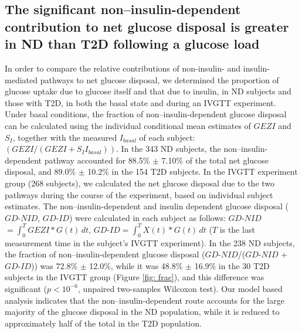 \documentclass[utf8]{frontiersSCNS} %
\begin{document}
\subsection{The significant non–insulin-dependent contribution to net glucose disposal is greater in ND than T2D following a glucose load}
In order to compare the relative contributions of non-insulin- and insulin-mediated pathways to net glucose disposal, we determined the proportion of glucose uptake due to glucose itself and that due to insulin, in ND subjects and those with T2D, in both the basal state and during an IVGTT experiment. Under basal conditions, the fraction of non–insulin-dependent glucose disposal can be calculated using the individual conditional mean estimates of $GEZI$ and $S_I$, together with the measured $I_{basal}$ of each subject: $\left( {GEZI/\left( {GEZI + {S_I}{I_{basal}}} \right)} \right)$. In the 343 ND subjects, the non–insulin-dependent pathway accounted for 88.5\% $\pm$ 7.10\% of the total net glucose disposal, and 89.0\% $\pm$ 10.2\% in the 154 T2D subjects. In the IVGTT experiment group (268 subjects), we calculated the net glucose disposal due to the two pathways during the course of the experiment, based on individual subject estimates. The non–insulin-dependent and insulin dependent glucose disposal ($GD$-$NID$, $GD$-$ID$) were calculated in each subject as follows: $GD$-$NID$$=\int_{0}^{T} GEZI*G(t) \,dt$, $GD$-$ID$$=\int_{0}^{T} X(t)*G(t) \,dt$ ($T$ is the last measurement time in the subject's IVGTT experiment). In the 238 ND subjects, the fraction of non–insulin-dependent glucose disposal ($GD$-$NID$/($GD$-$NID$ + $GD$-$ID$)) was 72.8\% $\pm$ 12.0\%, while it was 48.8\% $\pm$ 16.9\% in the 30 T2D subjects in the IVGTT group (Figure \ref{fig: frac}), and this difference was significant ($p<10^{-6}$, unpaired two-samples Wilcoxon test). Our model based analysis indicates that the non–insulin-dependent route accounts for the large majority of the glucose disposal in the ND population, while it is reduced to approximately half of the total in the T2D population.  
\end{document}
